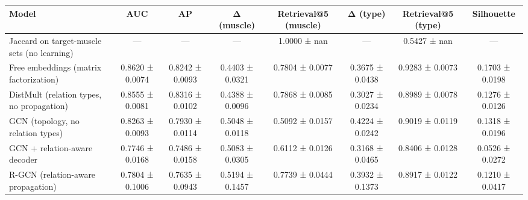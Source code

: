 \begin{tabular}{lccccccc}
\toprule
Model & AUC & AP & Δ (muscle) & Retrieval@5 (muscle) & Δ (type) & Retrieval@5 (type) & Silhouette \\
\midrule
Jaccard on target-muscle sets (no learning) & — & — & — & 1.0000 ± nan & — & 0.5427 ± nan & — \\
Free embeddings (matrix factorization) & 0.8620 ± 0.0074 & 0.8242 ± 0.0093 & 0.4403 ± 0.0321 & 0.7804 ± 0.0077 & 0.3675 ± 0.0438 & 0.9283 ± 0.0073 & 0.1703 ± 0.0198 \\
DistMult (relation types, no propagation) & 0.8555 ± 0.0081 & 0.8316 ± 0.0102 & 0.4388 ± 0.0096 & 0.7868 ± 0.0085 & 0.3027 ± 0.0234 & 0.8989 ± 0.0078 & 0.1276 ± 0.0126 \\
GCN (topology, no relation types) & 0.8263 ± 0.0093 & 0.7930 ± 0.0114 & 0.5048 ± 0.0118 & 0.5092 ± 0.0157 & 0.4224 ± 0.0242 & 0.9019 ± 0.0119 & 0.1318 ± 0.0196 \\
GCN + relation-aware decoder & 0.7746 ± 0.0168 & 0.7486 ± 0.0158 & 0.5083 ± 0.0305 & 0.6112 ± 0.0126 & 0.3168 ± 0.0465 & 0.8406 ± 0.0128 & 0.0526 ± 0.0272 \\
R-GCN (relation-aware propagation) & 0.7804 ± 0.1006 & 0.7635 ± 0.0943 & 0.5194 ± 0.1457 & 0.7739 ± 0.0444 & 0.3932 ± 0.1373 & 0.8917 ± 0.0122 & 0.1210 ± 0.0417 \\
\bottomrule
\end{tabular}
